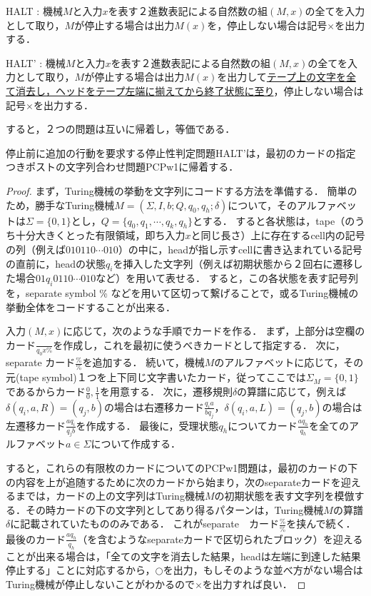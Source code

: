 \documentclass[uplatex, dvipdfmx]{jsreport}
\begin{document}
\begin{screen}
    HALT : 機械$M$と入力$x$を表す２進数表記による自然数の組$(M,x)$の全てを入力として取り，$M$が停止する場合は出力$M(x)$を，停止しない場合は記号$\times$を出力する．

    HALT' : 機械$M$と入力$x$を表す２進数表記による自然数の組$(M,x)$の全てを入力として取り，$M$が停止する場合は出力$M(x)$を出力して\underline{テープ上の文字を全て消去し，ヘッドをテープ左端に揃えてから終了状態に至り}，停止しない場合は記号$\times$を出力する．
\end{screen}
すると，２つの問題は互いに帰着し，等価である．

\begin{proposition}
    停止前に追加の行動を要求する停止性判定問題HALT'は，最初のカードの指定つきポストの文字列合わせ問題PCPw1に帰着する．
\end{proposition}
\begin{proof}
まず，Turing機械の挙動を文字列にコードする方法を準備する．
簡単のため，勝手なTuring機械$M=(\Sigma,I,b;Q,q_0,q_h;\delta)$について，そのアルファベットは$\Sigma=\{0,1\}$とし，$Q=\{ q_0,q_1,\cdots,q_k,q_h \}$とする．
すると各状態は，tape（のうち十分大きくとった有限領域，即ち入力$x$と同じ長さ）上に存在するcell内の記号の列（例えば$010110\cdots 010$）の中に，headが指し示すcellに書き込まれている記号の直前に，headの状態$q_i$を挿入した文字列（例えば初期状態から２回右に遷移した場合$01q_i0110\cdots 010$など）を用いて表せる．
すると，この各状態を表す記号列を，separate symbol \% などを用いて区切って繋げることで，或るTuring機械の挙動全体をコードすることが出来る．

入力$(M,x)$に応じて，次のような手順でカードを作る．
まず，上部分は空欄のカード$\frac{ }{ q_0x\% }$を作成し，これを最初に使うべきカードとして指定する．
次に，separate カード$\frac{\%}{\%}$を追加する．
続いて，機械$M$のアルファベットに応じて，その元(tape symbol)１つを上下同じ文字書いたカード，従ってここでは$\Sigma_M=\{0,1\}$であるからカード$\frac{0}{0}, \frac{1}{1}$を用意する．
次に，遷移規則$\delta$の算譜に応じて，例えば$\delta(q_i,a,R)=(q_j,b)$の場合は右遷移カード$\frac{q_ia}{bq_j}$，$\delta(q_i,a,L)=(q_j,b)$の場合は左遷移カード$\frac{aq_i}{q_jb}$を作成する．
最後に，受理状態$q_h$についてカード$\frac{aq_h}{q_h}$を全てのアルファベット$a\in \Sigma$について作成する．

すると，これらの有限枚のカードについてのPCPw1問題は，最初のカードの下の内容を上が追随するために次のカードから始まり，次のseparateカードを迎えるまでは，カードの上の文字列はTuring機械$M$の初期状態を表す文字列を模倣する．その時カードの下の文字列としてあり得るパターンは，Turing機械$M$の算譜$\delta$に記載されていたもののみである．
これがseparate　カード$\frac{\%}{\%}$を挟んで続く．最後のカード$\frac{aq_h}{q_h}$（を含むようなseparateカードで区切られたブロック）を迎えることが出来る場合は，「全ての文字を消去した結果，headは左端に到達した結果停止する」ことに対応するから，$\bigcirc$を出力，もしそのような並べ方がない場合はTuring機械が停止しないことがわかるので$\times$を出力すれば良い．
\end{proof}
\end{document}
